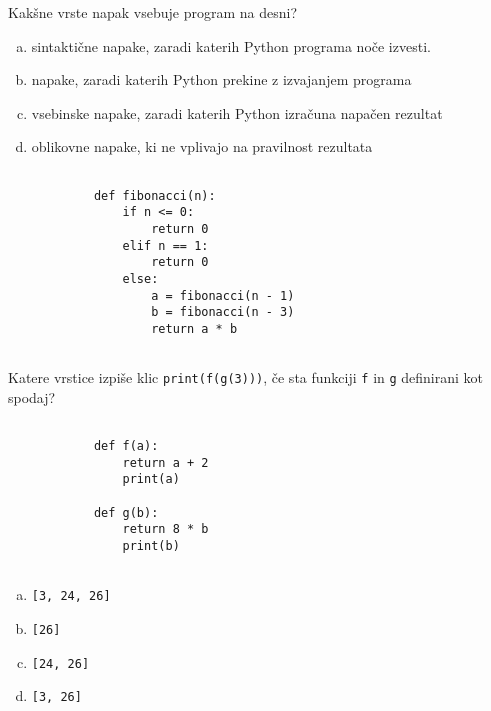 \documentclass[arhiv, 10pt]{../izpit}
\newcommand{\inlinepy}[1]{\texttt{#1}}
\begin{document}
        \naloga*
        \begin{multicols}{2}
        \noindent
        Kakšne vrste napak vsebuje program na desni?

        \begin{enumerate}[(a)]
\item sintaktične napake, zaradi katerih Python programa noče izvesti.
\item napake, zaradi katerih Python prekine z izvajanjem programa
\item vsebinske napake, zaradi katerih Python izračuna napačen rezultat
\item oblikovne napake, ki ne vplivajo na pravilnost rezultata
\end{enumerate}

        \columnbreak

        \begin{verbatim}
        
            def fibonacci(n):
                if n <= 0:
                    return 0
                elif n == 1:
                    return 0
                else:
                    a = fibonacci(n - 1)
                    b = fibonacci(n - 3)
                    return a * b
            
        \end{verbatim}

        \end{multicols}

    
        \naloga*
        Katere vrstice izpiše klic \inlinepy{print(f(g(3)))}, če sta funkciji \inlinepy{f} in \inlinepy{g} definirani kot spodaj?

        \begin{multicols}{2}
        \begin{verbatim}
        
            def f(a):
                return a + 2
                print(a)

            def g(b):
                return 8 * b
                print(b)
        
        \end{verbatim}

        \begin{enumerate}[(a)]
\item \inlinepy{[3, 24, 26]}
\item \inlinepy{[26]}
\item \inlinepy{[24, 26]}
\item \inlinepy{[3, 26]}
\end{enumerate}

        \end{multicols}
    
\end{document}
